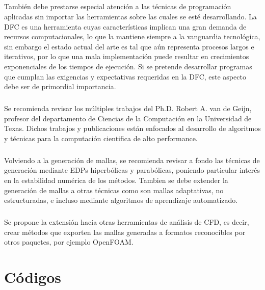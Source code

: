 \documentclass[letterpaper, openright, 12pt]{book}
\begin{document}
\paragraph*{}
    También debe prestarse especial atención a las técnicas de programación
    aplicadas sin importar las herramientas sobre las cuales se esté
    desarrollando. La DFC es una herramienta cuyas características implican una
    gran demanda de recursos computacionales, lo que la mantiene siempre a la
    vanguardia tecnológica, sin embargo el estado actual del arte es tal que
    aún representa procesos largos e iterativos, por lo que una mala
    implementación puede resultar en crecimientos exponenciales de los tiempos
    de ejecución. Si se pretende desarrollar programas que cumplan las
    exigencias y expectativas requeridas en la DFC, este aspecto debe ser de
    primordial importancia.

\paragraph*{}
    Se recomienda revisar los múltiples trabajos del Ph.D. Robert A. van de
    Geijn, profesor del departamento de Ciencias de la Computación en la
    Universidad de Texas. Dichos trabajos y publicaciones están enfocados al
    desarrollo de algoritmos y técnicas para la computación cientifica de alto
    performance.

\paragraph*{}
    Volviendo a la generación de mallas, se recomienda revisar a fondo las
    técnicas de generación mediante EDPs hiperbólicas y parabólicas, poniendo
    particular interés en la estabilidad numérica de los métodos. Tambien se
    debe extender la generación de mallas a otras técnicas como son mallas
    adaptativas, no estructuradas, e incluso mediante algoritmos de aprendizaje
    automatizado.

\paragraph*{}
    Se propone la extensión hacia otras herramientas de análisis de CFD, es
    decir, crear métodos que exporten las mallas generadas a formatos
    reconocibles por otros paquetes, por ejemplo OpenFOAM\@.
%
%
%
%
%

%
%
%
%
%
\appendix
\chapter{Códigos}\label{appCode}
\end{document}
